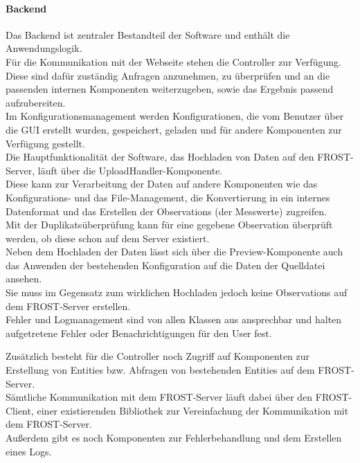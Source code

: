 \paragraph{Backend}
Das Backend ist zentraler Bestandteil der Software und enthält die Anwendungslogik.\\
Für die Kommunikation mit der Webseite stehen die Controller zur Verfügung.\\
Diese sind dafür zuständig Anfragen anzunehmen, zu überprüfen und an die passenden internen Komponenten weiterzugeben, sowie das Ergebnis passend aufzubereiten.\\

\noindent Im Konfigurationsmanagement werden Konfigurationen, die vom Benutzer über die GUI erstellt wurden, gespeichert, geladen und für andere Komponenten zur Verfügung gestellt.\\

\noindent Die Hauptfunktionalität der Software, das Hochladen von Daten auf den FROST-Server, läuft über die UploadHandler-Komponente.\\
Diese kann zur Verarbeitung der Daten auf andere Komponenten wie das Konfigurations- und das File-Management, die Konvertierung in ein internes Datenformat und das Erstellen der Observations (der Messwerte) zugreifen.\\
Mit der Duplikatsüberprüfung kann für eine gegebene Observation überprüft werden, ob diese schon auf dem Server existiert.\\
Neben dem Hochladen der Daten lässt sich über die Preview-Komponente auch das Anwenden der bestehenden Konfiguration auf die Daten der Quelldatei ansehen.\\
Sie muss im Gegensatz zum wirklichen Hochladen jedoch keine Observations auf dem FROST-Server erstellen.\\

\noindent Fehler und Logmanagement sind von allen Klassen aus ansprechbar und halten aufgetretene Fehler oder Benachrichtigungen für den User fest.

\noindent Zusätzlich besteht für die Controller noch Zugriff auf Komponenten zur Erstellung von Entities bzw. Abfragen von bestehenden Entities auf dem FROST-Server.\\
Sämtliche Kommunikation mit dem FROST-Server läuft dabei über den FROST-Client, einer existierenden Bibliothek zur Vereinfachung der Kommunikation mit dem FROST-Server.\\
Außerdem gibt es noch Komponenten zur Fehlerbehandlung und dem Erstellen eines Logs.

